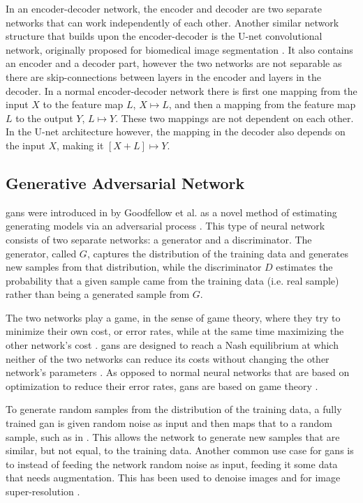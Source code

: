 In an encoder-decoder network, the encoder and decoder are two separate networks that can work independently of each other. Another similar network structure that builds upon the encoder-decoder is the U-net convolutional network, originally proposed for biomedical image segmentation \cite{unet}. It also contains an encoder and a decoder part, however the two networks are not separable as there are skip-connections between layers in the encoder and layers in the decoder. In a normal encoder-decoder network there is first one mapping from the input $X$ to the feature map $L$, $X \mapsto L$, and then a mapping from the feature map $L$ to the output $Y$, $L \mapsto Y$. These two mappings are not dependent on each other. In the U-net architecture however,  the mapping in the decoder also depends on the input $X$, making it $[X+L] \mapsto Y$. 


\subsection{Generative Adversarial Network}
\label{sec:ml:types:gan}
\acrfull{gan}s were introduced in \citeyear{goodfellow2014gan} by Goodfellow et al.  as a novel method of estimating generating models via an adversarial process \cite{goodfellow2014gan}. This type of neural network consists of two separate networks: a generator and a discriminator. The generator, called $G$, captures the distribution of the training data and generates new samples from that distribution, while the discriminator $D$ estimates the probability that a given sample came from the training data (i.e. real sample) rather than being a generated sample from $G$. 

The two networks play a game, in the sense of game theory, where they try to minimize their own cost, or error rates, while at the same time maximizing the other network's cost \cite{goodfellow2020gan}. \acrshort{gan}s are designed to reach a Nash equilibrium at which neither of the two networks can reduce its costs without changing the other network's parameters \cite{liu2020tomogan}. As opposed to normal neural networks that are based on optimization to reduce their error rates, \acrshort{gan}s are based on game theory \cite{goodfellow2020gan}. 

To generate random samples from the distribution of the training data, a fully trained \acrshort{gan} is given random noise as input and then maps that to a random sample, such as in \cite{zhangsagan}. This allows the network to generate new samples that are similar, but not equal, to the training data. Another common use case for \acrshort{gan}s is to instead of feeding the network random noise as input, feeding it some data that needs augmentation. This has been used to denoise images and for image super-resolution \cite{8710893,Ledig_2017_CVPR}. 


